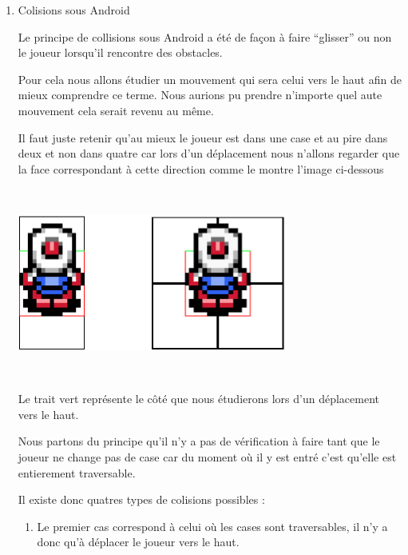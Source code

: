 				\begin{enumerate}
				  \item Colisions sous Android
				  
				  		Le principe de collisions sous Android a été de façon à faire ``glisser''
				  		ou non le joueur lorsqu'il rencontre des obstacles.
				  		
				  		
				  		Pour cela nous allons étudier un mouvement qui sera celui vers le haut
				  		afin de mieux comprendre ce terme.
				  		Nous aurions pu prendre n'importe quel aute mouvement cela serait revenu
				  		au même.
				  		
				  		Il faut juste retenir qu'au mieux le joueur est dans une case et au pire
				  		dans deux et non dans quatre car lors d'un déplacement nous n'allons
				  		regarder que la face correspondant à cette direction comme le montre
				  		l'image ci-dessous
				  		
				  		$\,$
				  		
						\begin{center}						
							\includegraphics[width=336px,height=168px]{Developpement/Img/ex2.eps}
						\end{center}
						
				  		$\,$				  		
				  		
				  		Le trait vert représente le côté que nous étudierons lors d'un
				  		déplacement vers le haut.
				  		
				  		
				  		Nous partons du principe qu'il n'y a pas de vérification à faire tant
				  		que le joueur ne change pas de case car du moment où il y est entré
				  		c'est qu'elle est entierement traversable.
				  		
				  		Il existe donc quatres types de colisions possibles :
				  		
				  		\begin{enumerate}

				  		  \item Le premier cas correspond à celui où les cases sont
				  		  traversables, il n'y a donc qu'à déplacer le joueur vers le haut.


\end{enumerate}
\end{enumerate}
